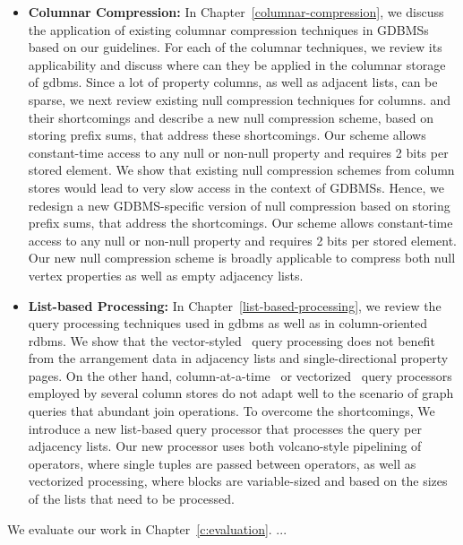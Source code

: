 \begin{itemize}
	\item \textbf{Columnar Compression:} In Chapter~\ref{columnar-compression}, we discuss the application of existing columnar compression techniques in GDBMSs based on our guidelines. For each of the columnar techniques, we review its applicability and discuss where can they be applied in the columnar storage of \gls{gdbms}. Since a lot of property columns, as well as adjacent lists, can be sparse, we next review existing null compression techniques for columns. and their shortcomings and describe a new null compression scheme, based on storing prefix sums, that address these shortcomings. Our scheme allows constant-time access to any null or non-null property and requires 2 bits per stored element. We show that existing null compression schemes from column stores would lead to very slow access in the context of GDBMSs. Hence, we redesign a new GDBMS-specific version of null compression based on storing prefix sums, that address the shortcomings. Our scheme allows constant-time access to any null or non-null property and requires 2 bits per stored element. Our new null compression scheme is broadly applicable to compress both null vertex properties as well as empty adjacency lists.
	
	\item \textbf{List-based Processing:} In Chapter~\ref{list-based-processing}, we review the query processing techniques used in \gls{gdbms} as well as in column-oriented \gls{rdbms}. We show that the vector-styled~\cite{volcano} query processing does not benefit from the arrangement data in adjacency lists and single-directional property pages. On the other hand, column-at-a-time~\cite{col-vs-row} or vectorized~\cite{boncz-vectorwise1} query processors employed by several column stores do not adapt well to the scenario of graph queries that abundant join operations. To overcome the shortcomings, We introduce a new list-based query processor that processes the query per adjacency lists. Our new processor uses both volcano-style pipelining of operators, where single tuples are passed between operators, as well as vectorized processing, where blocks are variable-sized and based on the sizes of the lists that need to be processed.
\end{itemize}

We evaluate our work in Chapter~\ref{c:evaluation}. ...
